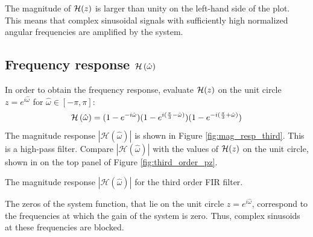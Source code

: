 The magnitude of $\mathcal{H}(z)$ is larger than unity on the left-hand side of
the plot. This means that complex sinusoidal signals with sufficiently
high normalized angular frequencies are amplified by the system.




\subsection{Frequency response $\mathcal{H}\left(\hat{\omega}\right)$}

In order to obtain the frequency response, evaluate $\mathcal{H}(z)$ on the unit
circle $z=e^{i\hat{\omega}}$ for $\hat{\omega}\in[-\pi,\pi]$:
\begin{equation}
\mathcal{H}\left(\hat{\omega}\right) = (1-e^{-i\hat{\omega}})(1-e^{i(\frac{\pi}{3}-\hat{\omega})})(1-e^{-i(\frac{\pi}{3}+\hat{\omega})})
\end{equation}
The magnitude response $|\mathcal{H}(\hat{\omega})|$ is shown in Figure
\ref{fig:mag_resp_third}. This is a high-pass filter. Compare
$|\mathcal{H}(\hat{\omega})|$ with the values of $\mathcal{H}(z)$ on the unit
circle, shown in on the top panel of Figure \ref{fig:third_order_pz}.


\begin{marginfigure}
\begin{center}
\end{center}
\caption{The magnitude response $|\mathcal{H}(\hat{\omega})|$ for the third order FIR filter.}
\label{fig:mag_resp_third}
\end{marginfigure}

The zeros of the system function, that lie on the unit circle $z=e^{i\hat{\omega}}$, correspond to the frequencies at which the gain of the system is zero. Thus, complex sinusoids at these frequencies are blocked. 


